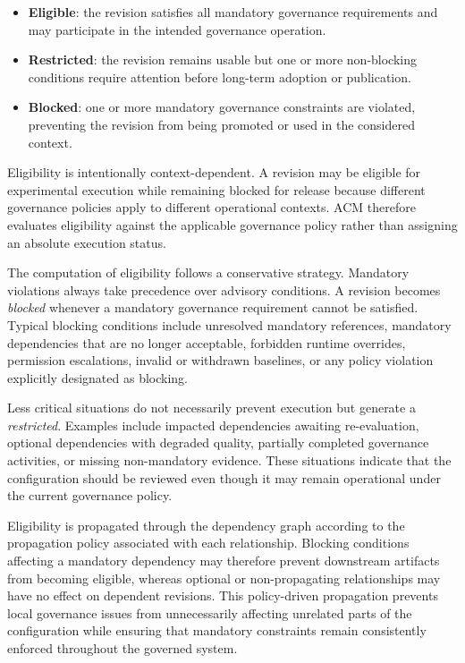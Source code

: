 \documentclass[10pt]{article}
\begin{document}
\begin{itemize}
	\item \textbf{Eligible}: the revision satisfies all mandatory governance requirements and may participate in the intended governance operation.
	\item \textbf{Restricted}: the revision remains usable but one or more non-blocking conditions require attention before long-term adoption or publication.
	\item \textbf{Blocked}: one or more mandatory governance constraints are violated, preventing the revision from being promoted or used in the considered context.
\end{itemize}

Eligibility is intentionally context-dependent. A revision may be eligible for experimental execution while remaining blocked for release because different governance policies apply to different operational contexts. ACM therefore evaluates eligibility against the applicable governance policy rather than assigning an absolute execution status.

The computation of eligibility follows a conservative strategy. Mandatory violations always take precedence over advisory conditions. A revision becomes \textit{blocked} whenever a mandatory governance requirement cannot be satisfied. Typical blocking conditions include unresolved mandatory references, mandatory dependencies that are no longer acceptable, forbidden runtime overrides, permission escalations, invalid or withdrawn baselines, or any policy violation explicitly designated as blocking.

Less critical situations do not necessarily prevent execution but generate a \textit{restricted}. Examples include impacted dependencies awaiting re-evaluation, optional dependencies with degraded quality, partially completed governance activities, or missing non-mandatory evidence. These situations indicate that the configuration should be reviewed even though it may remain operational under the current governance policy.

Eligibility is propagated through the dependency graph according to the propagation policy associated with each relationship. Blocking conditions affecting a mandatory dependency may therefore prevent downstream artifacts from becoming eligible, whereas optional or non-propagating relationships may have no effect on dependent revisions. This policy-driven propagation prevents local governance issues from unnecessarily affecting unrelated parts of the configuration while ensuring that mandatory constraints remain consistently enforced throughout the governed system.
\end{document}
